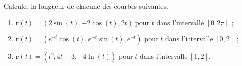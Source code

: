 \begin{exercice}\label{exodevoir3-0004}

Calculer la longueur de chacune des courbes suivantes. 
\begin{enumerate}
\item $\mathbf{r}(t)= (2\sin(t), -2\cos(t), 2t)$ pour $t$ dans l'intervalle $[0,2\pi]$ ;
\item $\mathbf{r}(t)= (e^{-t}\cos(t), e^{-t}\sin(t), e^{-t})$ pour $t$ dans l'intervalle $[0,2]$ ;
\item $\mathbf{r}(t)= (t^2, 4t+3, -4\ln(t))$ pour $t$ dans l'intervalle $[1,2]$.  
\end{enumerate}
\end{exercice}


